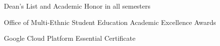 \documentclass{resume}
\newif\ifen
\newif\ifzh
\newif\ifboth
\newcommand{\en}[1]{\ifen#1\fi}
\newcommand{\zh}[1]{\ifzh#1\fi}
\newcommand{\both}[1]{\ifboth#1\fi}
\begin{document}
    \en{\datedsubsection{Financial Record Keeping App}{}}
    \zh{\datedsubsection{个人记账app}{}}
    \begin{ind}
        \en{\role{}{For \textbf{Programming Handheld System} course taken in \textit{University of Maryland}}}
        \zh{\role{马里兰大学iOS编程课程作业}{}}
    \end{ind}
    \en{
        \begin{jobitemize}
            \item Created using latest SwiftUI framework
            \item A simplified bookkeeping app that stores everything locally
            \item Designed with payment remainder and transaction tagging system
        \end{jobitemize}
    }
    \zh{
        \begin{jobitemize}
            \item 基于最新的SwiftUI框架
            \item 完全本地化的个人记账app
            \item 具有账单体系与交易记录功能，可对交易进行拍照、加tag等进行分类
        \end{jobitemize}
    }

    \section{\faCertificate\ \en{Honors \& Certificates}\both{ }\zh{荣誉与证书}}
    \begin{myitemize}
        \item Dean's List and Academic Honor in all semesters
        \item Office of Multi-Ethnic Student Education Academic Excellence Awards
        \item Google Cloud Platform Essential Certificate
    \end{myitemize}
\end{document}
